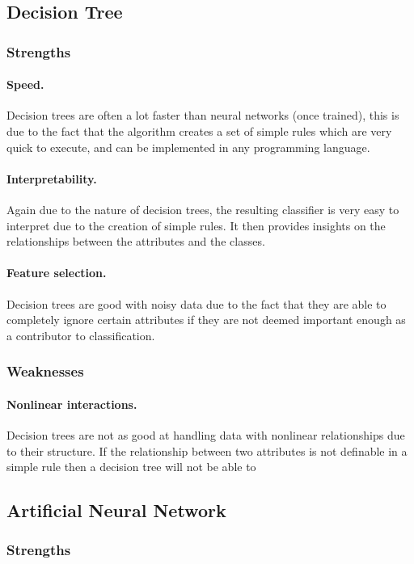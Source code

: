 \documentclass[12pt]{article}
\begin{document}
  \subsection{Decision Tree}
    \subsubsection{Strengths}
      \paragraph{Speed.}
        Decision trees are often a lot faster than neural networks (once trained), this is due to the fact that the algorithm creates a set of simple rules which are very quick to execute, and can be implemented in any programming language.
      \paragraph{Interpretability.}
        Again due to the nature of decision trees, the resulting classifier is very easy to interpret due to the creation of simple rules. It then provides insights on the relationships between the attributes and the classes.
      \paragraph{Feature selection.}
        Decision trees are good with noisy data due to the fact that they are able to completely ignore certain attributes if they are not deemed important enough as a contributor to classification.

    \subsubsection{Weaknesses}
      \paragraph{Nonlinear interactions.}
        Decision trees are not as good at handling data with nonlinear relationships due to their structure. If the relationship between two attributes is not definable in a simple rule then a decision tree will not be able to

  \subsection{Artificial Neural Network}
    \subsubsection{Strengths}
\end{document}
